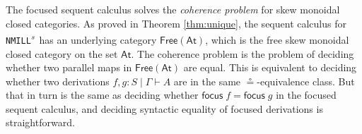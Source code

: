 \documentclass[copyright,creativecommons]{eptcs}
\theoremstyle{definition}
\newcommand{\NMILL}{\texttt{NMILL}}
\newcommand{\SkNMILL}{\NMILL\textsuperscript{\textit{s}}}
\newcommand{\FSkMCC}{\mathsf{Free}}
\begin{document}
The focused sequent calculus solves the \emph{coherence problem} for skew monoidal closed categories.
As proved in Theorem \ref{thm:unique}, the sequent calculus for \SkNMILL\ has an underlying category $\FSkMCC(\mathsf{At})$, which is the free skew monoidal closed category on the set $\mathsf{At}$. The coherence problem is the problem of deciding whether two parallel maps in $\FSkMCC(\mathsf{At})$ are equal. %
This is equivalent to deciding whether two derivations $f,g : S \mid \Gamma \vdash A$ are in the same $\circeq$-equivalence class. But that in turn is the same as deciding whether $\mathsf{focus}\;f = \mathsf{focus}\;g$ in the focused sequent calculus, and deciding syntactic equality of focused derivations is straightforward.


\end{document}
